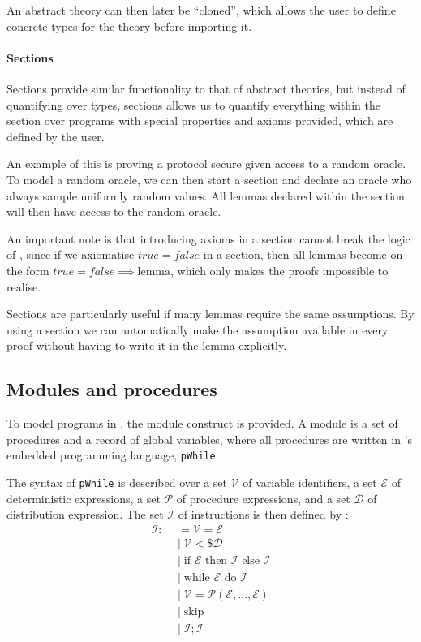An abstract theory can then later be ``cloned'', which allows the user to define
concrete types for the theory before importing it.

\paragraph{Sections}
Sections provide similar functionality to that of abstract theories, but instead of quantifying over
types, sections allows us to quantify everything within the section over programs
with special properties and axioms provided, which are defined by the user.

An example of this is proving a protocol secure given access to a
random oracle.
To model a random oracle, we can then start a section and declare an oracle who
always sample uniformly random values.
All lemmas declared within the section will then have access to the random
oracle.

An important note is that introducing axioms in a section cannot break the logic
of \easycrypt, since if we axiomatise $true = false$ in a section, then all
lemmas become on the form $true = false \implies \text{lemma}$, which only
makes the proofs impossible to realise.

Sections are particularly useful if many lemmas require the same assumptions. By
using a section we can automatically make the assumption available in every
proof without having to write it in the lemma explicitly.

\subsection{Modules and procedures}
\label{sec:ec_modules}
To model programs in \easycrypt, the module construct is provided.
A module is a set of procedures and a record of global variables, where all
procedures are written in \easycrypt's embedded programming language, \texttt{pWhile}.

The syntax of \texttt{pWhile} is described over a set $\mathcal{V}$ of variable
identifiers, a set $\mathcal{E}$ of deterministic expressions, a set
$\mathcal{P}$ of procedure expressions, and a set $\mathcal{D}$ of distribution
expression.
The set $\mathcal{I}$ of instructions is then defined
by \cite{zkcrypt}:
\begin{align*}
  \mathcal{I} ::&= \mathcal{V} = \mathcal{E} \\
              &|\; \mathcal{V} <\$ \mathcal{D} \\
              &|\; \text{if } \mathcal{E} \text{ then } \mathcal{I} \text{ else } \mathcal{I} \\
              &|\; \text{while } \mathcal{E} \text{ do } \mathcal{I} \\
              &|\; \mathcal{V} = \mathcal{P}(\mathcal{E}, \dots, \mathcal{E}) \\
              &|\; \text{skip} \\
              &|\; \mathcal{I}; \mathcal{I}
\end{align*}

